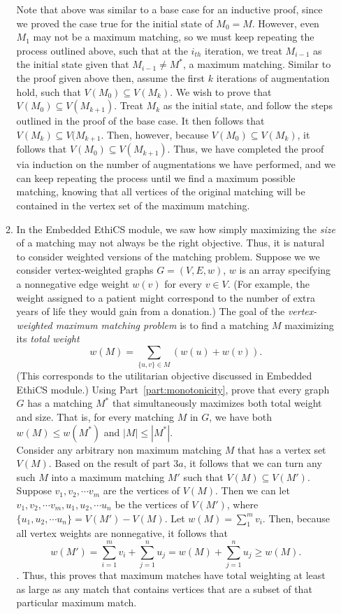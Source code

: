 \documentclass[11pt]{article}
\begin{document}
\begin{enumerate}
\begin{enumerate}
        Note that above was similar to a base case for an inductive proof, since we proved the case true for the initial state of $M_0 = M$. However, even $M_1$ may not be a maximum matching, so we must keep repeating the process outlined above, such that at the $i_{th}$ iteration, we treat $M_{i-1}$ as the initial state given that $M_{i-1} \neq M^*$, a maximum matching. 
        Similar to the proof given above then, assume the first $k$ iterations of augmentation hold, such that $V(M_0) \subseteq V(M_{k})$. We wish to prove that $V(M_0) \subseteq V(M_{k+1})$. Treat $M_k$ as the initial state, and follow the steps outlined in the proof of the base case. It then follows that $V(M_k) \subseteq V(M_{k+1}$. Then, however, because $V(M_0) \subseteq V(M_{k})$, it follows that $V(M_0) \subseteq V(M_{k+1})$. Thus, we have completed the proof via induction on the number of augmentations we have performed, and we can keep repeating the process until we find a maximum possible matching, knowing that all vertices of the original matching will be contained in the vertex set of the maximum matching. 
        \item   In the Embedded EthiCS module, we saw how simply maximizing the {\em size} of a matching may not always be the right objective.  Thus, it is natural to consider weighted versions of the matching problem. Suppose we
        we consider vertex-weighted graphs $G = (V,E,w)$, $w$ is an array specifying a nonnegative edge weight $w(v)$ for every $v\in V$.  (For example, the weight assigned to a patient might correspond to the number of extra years of life they would gain from a donation.)
          The goal of the {\em vertex-weighted maximum matching problem} is to find a matching $M$ maximizing its {\em total weight} $$w(M) = \sum_{\{u,v\}\in M} (w(u)+w(v)).$$
        (This corresponds to the utilitarian objective discussed in Embedded EthiCS module.)
        Using Part~\ref{part:monotonicity}, prove that every graph $G$ has a matching $M^*$ that simultaneously maximizes both total weight and size.  That is, for every matching $M$ in $G$, we have
        both $w(M)\leq w(M^*)$ and $|M|\leq |M^*|$. \\
        
        Consider any arbitrary non maximum matching $M$ that has a vertex set $V(M)$. Based on the result of part $3a$, it follows that we can turn any such $M$ into a maximum matching $M'$ such that $V(M) \subseteq V(M')$. Suppose $v_1, v_2, \cdots v_m$ are the vertices of $V(M)$. Then we can let $v_1, v_2, \cdots v_m, u_1, u_2, \cdots u_n$ be the vertices of $V(M')$, where $\{u_1, u_2, \cdots u_n\} = V(M') - V(M)$. Let $w(M) = \sum_1^m v_i$. Then, because all vertex weights are nonnegative, it follows that 
        $$w(M') = \sum_{i=1}^m v_i + \sum_{j=1}^n u_j = w(M) + \sum_{j=1}^n u_j \geq w(M).$$. Thus, this proves that maximum matches have total weighting at least as large as any match that contains vertices that are a subset of that particular maximum match. \\
        

\end{enumerate}
\end{enumerate}
\end{document}

